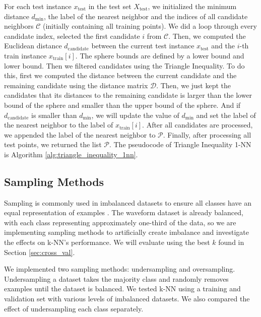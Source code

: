 \documentclass{article}
\theoremstyle{plain}
\theoremstyle{definition}
\theoremstyle{remark}
\begin{document}
For each test instance $x_{\text{test}}$ in the test set $X_{\text{test}}$, we initialized the minimum distance $d_{\text{min}}$, the label of the nearest neighbor and the indices of all candidate neighbors $\mathcal{C}$ (initially containing all training points). We did a loop through every candidate index, selected the first candidate $i$ from $\mathcal{C}$. Then, we computed the Euclidean distance $d_{\text{candidate}}$ between the current test instance $x_{\text{test}}$ and the $i$-th train instance $x_{\text{train}}[i]$. The sphere bounds are defined by a lower bound and lower bound. Then we filtered candidates using the Triangle Inequality. To do this, first we computed the distance between the current candidate and the remaining candidate using the distance matrix $\mathcal{D}$. Then, we just kept the candidates that its distances to the remaining candidate is larger than the lower bound of the sphere and smaller than the upper bound of the sphere. And if $d_{\text{candidate}}$ is smaller than $d_{\text{min}}$, we will update the value of $d_{\text{min}}$ and set the label of the nearest neighbor to the label of $x_{\text{train}}[i]$. After all candidates are processed, we appended the label of the nearest neighbor to $\mathcal{P}$. Finally, after processing all test points, we returned the list $\mathcal{P}$. The pseudocode of Triangle Inequality 1-NN is Algorithm \ref{alg:triangle_inequality_1nn}.




\subsection{Sampling Methods}
    \label{sec:sampling_methods}
    Sampling is commonly used in imbalanced datasets to ensure all classes have an equal representation of examples \cite{mohammed2020}. The waveform dataset is already balanced, with each class representing approximately one-third of the data, so we are implementing sampling methods to artificially create imbalance and investigate the effects on k-NN's performance. We will evaluate using the best $k$ found in Section \ref{sec:cross_val}.

    We implemented two sampling methods: undersampling and oversampling. Undersampling a dataset takes the majority class and randomly removes examples until the dataset is balanced. We tested k-NN using a training and validation set with various levels of imbalanced datasets. We also compared the effect of undersampling each class separately.
\end{document}
